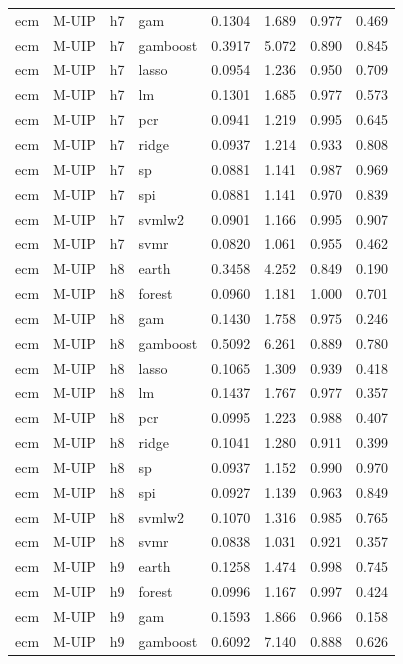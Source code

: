 \begin{ThreePartTable}
\begin{longtable}[t]{llclcccc}
ecm & M-UIP & h7 & gam & 0.1304 & 1.689 & 0.977 & 0.469\\
ecm & M-UIP & h7 & gamboost & 0.3917 & 5.072 & 0.890 & 0.845\\
ecm & M-UIP & h7 & lasso & 0.0954 & 1.236 & 0.950 & 0.709\\
ecm & M-UIP & h7 & lm & 0.1301 & 1.685 & 0.977 & 0.573\\
ecm & M-UIP & h7 & pcr & 0.0941 & 1.219 & 0.995 & 0.645\\
ecm & M-UIP & h7 & ridge & 0.0937 & 1.214 & 0.933 & 0.808\\
ecm & M-UIP & h7 & sp & 0.0881 & 1.141 & 0.987 & 0.969\\
ecm & M-UIP & h7 & spi & 0.0881 & 1.141 & 0.970 & 0.839\\
ecm & M-UIP & h7 & svmlw2 & 0.0901 & 1.166 & 0.995 & 0.907\\
ecm & M-UIP & h7 & svmr & 0.0820 & 1.061 & 0.955 & 0.462\\
\addlinespace
ecm & M-UIP & h8 & earth & 0.3458 & 4.252 & 0.849 & 0.190\\
ecm & M-UIP & h8 & forest & 0.0960 & 1.181 & 1.000 & 0.701\\
ecm & M-UIP & h8 & gam & 0.1430 & 1.758 & 0.975 & 0.246\\
ecm & M-UIP & h8 & gamboost & 0.5092 & 6.261 & 0.889 & 0.780\\
ecm & M-UIP & h8 & lasso & 0.1065 & 1.309 & 0.939 & 0.418\\
ecm & M-UIP & h8 & lm & 0.1437 & 1.767 & 0.977 & 0.357\\
ecm & M-UIP & h8 & pcr & 0.0995 & 1.223 & 0.988 & 0.407\\
ecm & M-UIP & h8 & ridge & 0.1041 & 1.280 & 0.911 & 0.399\\
ecm & M-UIP & h8 & sp & 0.0937 & 1.152 & 0.990 & 0.970\\
ecm & M-UIP & h8 & spi & 0.0927 & 1.139 & 0.963 & 0.849\\
ecm & M-UIP & h8 & svmlw2 & 0.1070 & 1.316 & 0.985 & 0.765\\
ecm & M-UIP & h8 & svmr & 0.0838 & 1.031 & 0.921 & 0.357\\
\addlinespace
ecm & M-UIP & h9 & earth & 0.1258 & 1.474 & 0.998 & 0.745\\
ecm & M-UIP & h9 & forest & 0.0996 & 1.167 & 0.997 & 0.424\\
ecm & M-UIP & h9 & gam & 0.1593 & 1.866 & 0.966 & 0.158\\
ecm & M-UIP & h9 & gamboost & 0.6092 & 7.140 & 0.888 & 0.626\\

\end{longtable}
\end{ThreePartTable}
